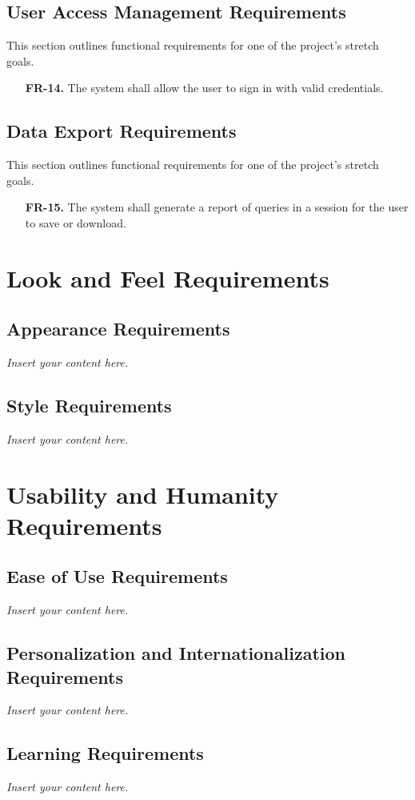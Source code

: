 \documentclass[12pt]{article}
\newcommand{\lips}{\textit{Insert your content here.}}
\begin{document}
\subsection{User Access Management Requirements}
This section outlines functional requirements for one of the project's stretch goals.
\begin{enumerate}
  \item[\textbf{FR-14.}] The system shall allow the user to sign in with valid credentials.
\end{enumerate}

\subsection{Data Export Requirements}
This section outlines functional requirements for one of the project's stretch goals.
\begin{enumerate}
  \item[\textbf{FR-15.}] The system shall generate a report of queries in a session for the user to save or download.
\end{enumerate}

\section{Look and Feel Requirements}
\subsection{Appearance Requirements}
\lips
\subsection{Style Requirements}
\lips

\section{Usability and Humanity Requirements}
\subsection{Ease of Use Requirements}
\lips
\subsection{Personalization and Internationalization Requirements}
\lips
\subsection{Learning Requirements}
\lips
\end{document}
